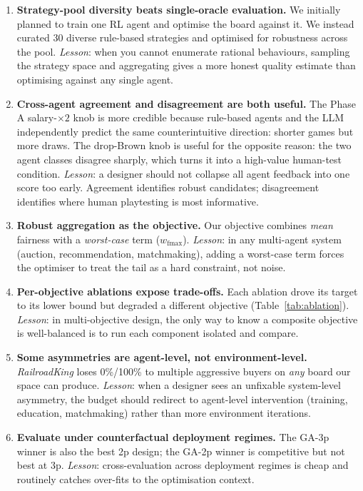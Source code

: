 \documentclass[10pt]{article}
\begin{document}
\begin{enumerate}[leftmargin=1.2em,itemsep=2pt]
\item \textbf{Strategy-pool diversity beats single-oracle evaluation.}
We initially planned to train one RL agent and optimise the board against
it. We instead curated 30 diverse rule-based strategies and optimised for
robustness across the pool. \emph{Lesson}: when you cannot enumerate
rational behaviours, sampling the strategy space and aggregating gives a
more honest quality estimate than optimising against any single agent.

\item \textbf{Cross-agent agreement and disagreement are both useful.}
The Phase A salary-$\times 2$ knob is more credible because rule-based
agents and the LLM independently predict the same counterintuitive
direction: shorter games but more draws. The drop-Brown knob is useful
for the opposite reason: the two agent classes disagree sharply, which
turns it into a high-value human-test condition. \emph{Lesson}: a
designer should not collapse all agent feedback into one score too
early. Agreement identifies robust candidates; disagreement identifies
where human playtesting is most informative.

\item \textbf{Robust aggregation as the objective.} Our objective combines
\emph{mean} fairness with a \emph{worst-case} term ($w_{\text{fmax}}$).
\emph{Lesson}: in any multi-agent system (auction, recommendation,
matchmaking), adding a worst-case term forces the optimiser to treat the
tail as a hard constraint, not noise.

\item \textbf{Per-objective ablations expose trade-offs.} Each ablation
drove its target to its lower bound but degraded a different objective
(Table~\ref{tab:ablation}). \emph{Lesson}: in multi-objective design,
the only way to know a composite objective is well-balanced is to run
each component isolated and compare.

\item \textbf{Some asymmetries are agent-level, not environment-level.}
\textsl{RailroadKing} loses 0\%/100\% to multiple aggressive buyers on
\emph{any} board our space can produce. \emph{Lesson}: when a designer
sees an unfixable system-level asymmetry, the budget should redirect to
agent-level intervention (training, education, matchmaking) rather than
more environment iterations.

\item \textbf{Evaluate under counterfactual deployment regimes.} The
GA-3p winner is also the best 2p design; the GA-2p winner is competitive
but not best at 3p. \emph{Lesson}: cross-evaluation across deployment
regimes is cheap and routinely catches over-fits to the optimisation
context.


\end{enumerate}
\end{document}
